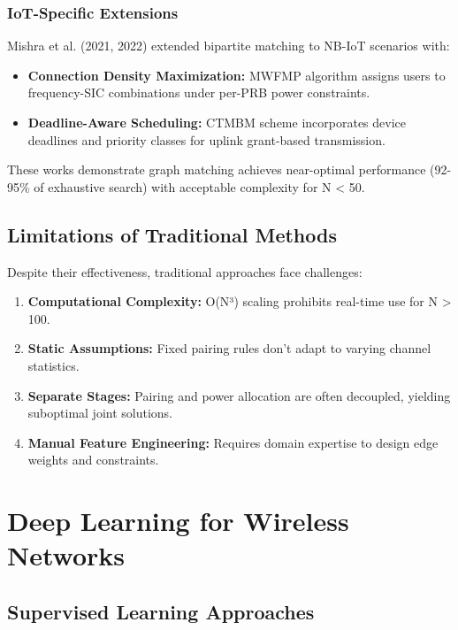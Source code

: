 \subsubsection{IoT-Specific Extensions}

Mishra et al. (2021, 2022) \cite{mishra2021maximizing, mishra2022connection} extended bipartite matching to NB-IoT scenarios with:
\begin{itemize}
    \item \textbf{Connection Density Maximization:} MWFMP algorithm assigns users to frequency-SIC combinations under per-PRB power constraints.
    \item \textbf{Deadline-Aware Scheduling:} CTMBM scheme incorporates device deadlines and priority classes for uplink grant-based transmission.
\end{itemize}

These works demonstrate graph matching achieves near-optimal performance (92-95\% of exhaustive search) with acceptable complexity for N < 50.

\subsection{Limitations of Traditional Methods}

Despite their effectiveness, traditional approaches face challenges:

\begin{enumerate}
    \item \textbf{Computational Complexity:} O(N³) scaling prohibits real-time use for N > 100.
    \item \textbf{Static Assumptions:} Fixed pairing rules don't adapt to varying channel statistics.
    \item \textbf{Separate Stages:} Pairing and power allocation are often decoupled, yielding suboptimal joint solutions.
    \item \textbf{Manual Feature Engineering:} Requires domain expertise to design edge weights and constraints.
\end{enumerate}

\section{Deep Learning for Wireless Networks}

\subsection{Supervised Learning Approaches}

